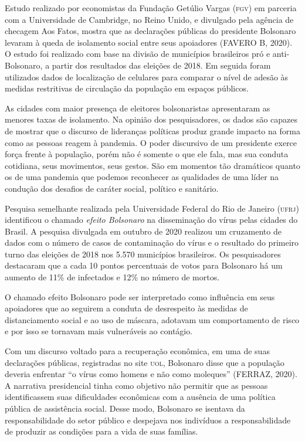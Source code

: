 Estudo realizado por economistas da Fundação Getúlio Vargas (\textsc{fgv}) em
parceria com a Universidade de Cambridge, no Reino Unido, e divulgado
pela agência de checagem Aos Fatos, mostra que as declarações públicas
do presidente Bolsonaro levaram à queda de isolamento social entre seus
apoiadores (FAVERO B, 2020). O estudo foi realizado com base na divisão
de municípios brasileiros pró e anti-Bolsonaro, a partir dos resultados
das eleições de 2018. Em seguida foram utilizados dados de localização
de celulares para comparar o nível de adesão às medidas restritivas de
circulação da população em espaços públicos.

As cidades com maior presença de eleitores bolsonaristas apresentaram as
menores taxas de isolamento. Na opinião dos pesquisadores, os dados são
capazes de mostrar que o discurso de lideranças políticas produz grande
impacto na forma como as pessoas reagem à pandemia. O poder discursivo
de um presidente exerce força frente à população, porém não é somente o
que ele fala, mas sua conduta cotidiana, seus movimentos, seus gestos.
São em momentos tão dramáticos quanto os de uma pandemia que podemos
reconhecer as qualidades de uma líder na condução dos desafios de
caráter social, político e sanitário.

Pesquisa semelhante realizada pela Universidade Federal do Rio de
Janeiro (\textsc{ufrj}) identificou o chamado \textit{efeito Bolsonaro} na
disseminação do vírus pelas cidades do Brasil. A pesquisa divulgada em
outubro de 2020 realizou um cruzamento de dados com o número de casos de
contaminação do vírus e o resultado do primeiro turno das eleições de 2018
nos 5.570 municípios brasileiros. Os pesquisadores destacaram que a cada
10 pontos percentuais de votos para Bolsonaro há um aumento de 11\% de
infectados e 12\% no número de mortos.

O chamado efeito Bolsonaro pode ser interpretado como influência em seus
apoiadores que ao seguirem a conduta de desrespeito às medidas de
distanciamento social e ao uso de máscara, adotavam um comportamento de
risco e por isso se tornavam mais vulneráveis ao contágio.

Com um discurso voltado para a recuperação econômica, em uma de suas
declarações públicas, registradas no site \textsc{uol}, Bolsonaro disse que a
população deveria enfrentar ``o vírus como homens e não como moleques''
(FERRAZ, 2020). A narrativa presidencial tinha como objetivo não
permitir que as pessoas identificassem suas dificuldades econômicas com
a ausência de uma política pública de assistência social. Desse modo,
Bolsonaro se isentava da responsabilidade do setor público e despejava
nos indivíduos a responsabilidade de produzir as condições para a vida
de suas famílias.

